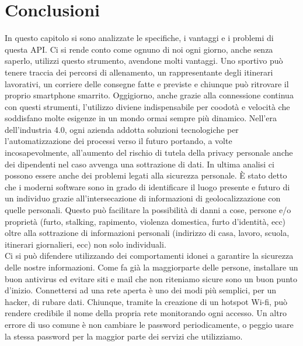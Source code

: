 \documentclass[12pt ,a4paper , twoside , openright ]{book}
\begin{document}
	\section{Conclusioni}
	In questo capitolo si sono analizzate le specifiche, i vantaggi e i problemi di questa API. Ci si rende conto come ognuno di noi ogni giorno, anche senza saperlo, utilizzi questo strumento, avendone molti vantaggi. Uno sportivo può tenere traccia dei percorsi di allenamento, un rappresentante degli itinerari lavorativi, un corriere delle consegne fatte e previste e chiunque può ritrovare il proprio smartphone smarrito. Oggigiorno, anche grazie alla connessione continua con questi strumenti, l'utilizzo diviene indispensabile per coodotà e velocità che soddisfano molte esigenze in un mondo ormai sempre più dinamico. Nell'era dell'industria 4.0, ogni azienda addotta soluzioni tecnologiche per l'automatizzazione dei processi verso il futuro portando, a volte incosapevolmente, all'aumento del rischio di tutela della privacy personale anche dei dipendenti nel caso avvenga una sottrazione di dati. In ultima analisi ci possono essere anche dei problemi legati alla sicurezza personale. \`E stato detto che i moderni software sono in grado di identificare il luogo presente e futuro di un individuo grazie all'intersecazione di informazioni di geolocalizzazione con quelle personali. Questo può facilitare la possibilità di danni a cose, persone e/o proprietà (furto, stalking, rapimento, violenza domestica, furto d'identità, ecc) oltre alla sottrazione di informazioni personali (indirizzo di casa, lavoro, scuola, itinerari giornalieri, ecc) non solo individuali. \\
	Ci si può difendere utilizzando dei comportamenti idonei a garantire la sicurezza delle nostre informazioni. Come fa già la maggiorparte delle persone, installare un buon antivirus ed evitare siti e mail che non riteniamo sicure sono un buon punto d'inizio. Connettersi ad una rete aperta è uno dei modi più semplici, per un hacker, di rubare dati. Chiunque, tramite la creazione di un hotspot Wi-fi, può rendere credibile il nome della propria rete monitorando ogni accesso. Un altro errore di uso comune è non cambiare le password periodicamente, o peggio usare la stessa password per la maggior parte dei servizi che utilizziamo. \\
\end{document}
